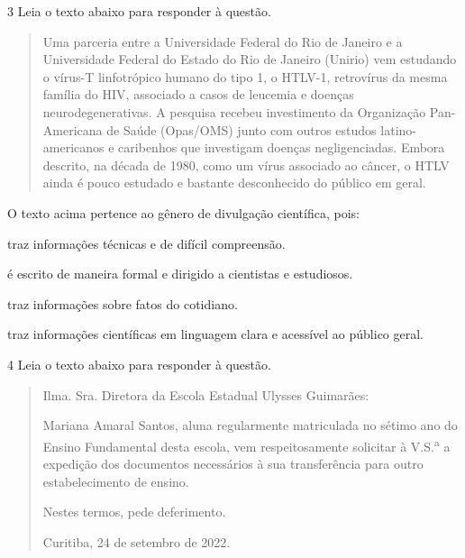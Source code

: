 \num{3} Leia o texto abaixo para responder à questão.

\begin{quote}
Uma parceria entre a Universidade Federal do Rio de Janeiro e a
Universidade Federal do Estado do Rio de Janeiro (Unirio) vem estudando
o vírus-T linfotrópico humano do tipo 1, o HTLV-1, retrovírus da mesma
família do HIV, associado a casos de leucemia e doenças
neurodegenerativas. A pesquisa recebeu investimento da Organização
Pan-Americana de Saúde (Opas/OMS) junto com outros estudos
latino-americanos e caribenhos que investigam doenças negligenciadas.
Embora descrito, na década de 1980, como um vírus associado ao câncer, o
HTLV ainda é pouco estudado e bastante desconhecido do público em geral.
\end{quote}


O texto acima pertence ao gênero de divulgação científica, pois:

\begin{escolha}
  
  \item traz informações técnicas e de difícil compreensão.
  
  \item é escrito de maneira formal e dirigido a cientistas e estudiosos.
  
  \item traz informações sobre fatos do cotidiano.
  
  \item traz informações científicas em linguagem clara e acessível ao público
  geral.

\end{escolha}

\pagebreak

\num{4} Leia o texto abaixo para responder à questão.

\begin{quote}

Ilma. Sra. Diretora da Escola Estadual Ulysses Guimarães:

Mariana Amaral Santos, aluna regularmente matriculada no sétimo ano do
Ensino Fundamental desta escola, vem respeitosamente solicitar à V.S.\textsuperscript{a} a
expedição dos documentos necessários à sua transferência para outro
estabelecimento de ensino.

Nestes termos, pede deferimento.

Curitiba, 24 de setembro de 2022.

\end{quote}

